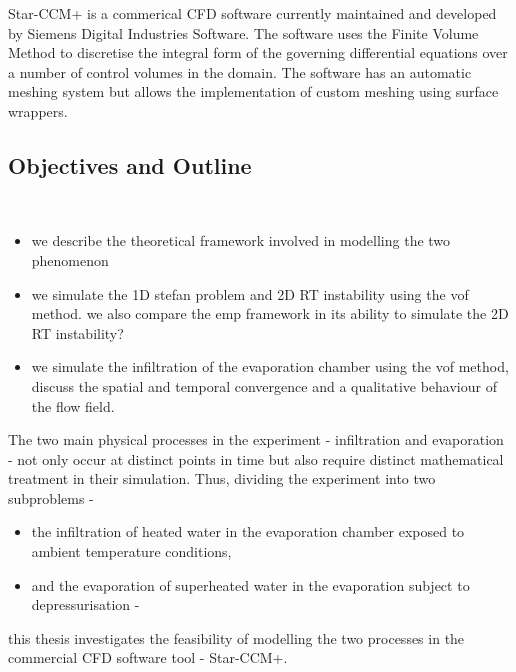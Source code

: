 Star-CCM+ is a commerical CFD software currently maintained and developed 
 by Siemens Digital Industries Software. The software uses the Finite Volume Method to
 discretise the integral form of the governing differential equations over a number 
 of control volumes in the domain. The software has an automatic meshing system but allows
 the implementation of custom meshing using surface wrappers.~

\subsection{Objectives and Outline}
~\hfill\\
\begin{itemize}
    \item we describe the theoretical framework involved in modelling the 
     two phenomenon
    \item we simulate the 1D stefan problem and 2D RT instability
  using the vof method. we also compare the emp framework in its ability to 
  simulate the 2D RT instability? 
    \item we simulate the infiltration of the evaporation chamber using the 
    vof method,
    discuss the spatial and temporal convergence and a qualitative
    behaviour of the flow field. 
\end{itemize}
The two main physical processes in the experiment - infiltration and evaporation - not only occur at distinct
 points in time but also require distinct mathematical treatment in their simulation. Thus, dividing 
 the experiment into two subproblems -  
 \begin{itemize}
    \item the infiltration of heated water in the evaporation chamber exposed to ambient temperature conditions, 
    \item and the evaporation of superheated water in the evaporation subject to depressurisation - 
 \end{itemize}
  this thesis investigates the feasibility of modelling the two processes in the commercial CFD software tool - Star-CCM+.






